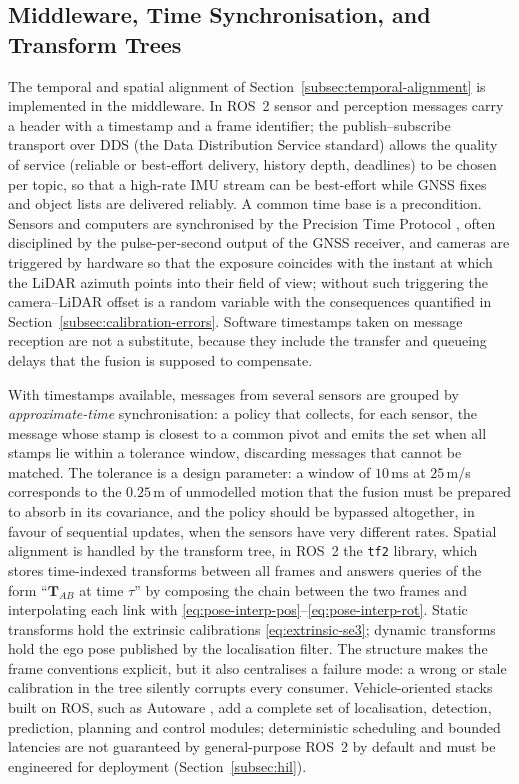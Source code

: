 \documentclass[graybox,envcountchap]{style/SNmono}
\begin{document}
\subsection{Middleware, Time Synchronisation, and Transform Trees}
\label{subsec:middleware}

The temporal and spatial alignment of Section~\ref{subsec:temporal-alignment} is implemented in the middleware. In ROS~2 \cite{macenski2022_ros2} sensor and perception messages carry a header with a timestamp and a frame identifier; the publish--subscribe transport over DDS (the Data Distribution Service standard) allows the quality of service (reliable or best-effort delivery, history depth, deadlines) to be chosen per topic, so that a high-rate IMU stream can be best-effort while GNSS fixes and object lists are delivered reliably. A common time base is a precondition. Sensors and computers are synchronised by the Precision Time Protocol \cite{ieee1588_2019}, often disciplined by the pulse-per-second output of the GNSS receiver, and cameras are triggered by hardware so that the exposure coincides with the instant at which the LiDAR azimuth points into their field of view; without such triggering the camera--LiDAR offset is a random variable with the consequences quantified in Section~\ref{subsec:calibration-errors}. Software timestamps taken on message reception are not a substitute, because they include the transfer and queueing delays that the fusion is supposed to compensate.

With timestamps available, messages from several sensors are grouped by \emph{approximate-time} synchronisation: a policy that collects, for each sensor, the message whose stamp is closest to a common pivot and emits the set when all stamps lie within a tolerance window, discarding messages that cannot be matched. The tolerance is a design parameter: a window of $10$\,ms at $25$\,m/s corresponds to the $0.25$\,m of unmodelled motion that the fusion must be prepared to absorb in its covariance, and the policy should be bypassed altogether, in favour of sequential updates, when the sensors have very different rates. Spatial alignment is handled by the transform tree, in ROS~2 the \texttt{tf2} library, which stores time-indexed transforms between all frames and answers queries of the form ``$\mathbf{T}_{AB}$ at time $\tau$'' by composing the chain between the two frames and interpolating each link with \eqref{eq:pose-interp-pos}--\eqref{eq:pose-interp-rot}. Static transforms hold the extrinsic calibrations \eqref{eq:extrinsic-se3}; dynamic transforms hold the ego pose published by the localisation filter. The structure makes the frame conventions explicit, but it also centralises a failure mode: a wrong or stale calibration in the tree silently corrupts every consumer. Vehicle-oriented stacks built on ROS, such as Autoware \cite{kato2018_autoware}, add a complete set of localisation, detection, prediction, planning and control modules; deterministic scheduling and bounded latencies are not guaranteed by general-purpose ROS~2 by default and must be engineered for deployment (Section~\ref{subsec:hil}).
\end{document}
